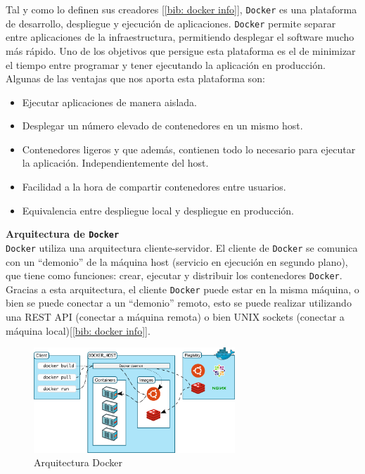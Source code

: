\documentclass[a4paper, oneside, 12pt]{book}
\begin{document}
	\noindent Tal y como lo definen sus creadores [\ref{bib: docker info}], \texttt{Docker} es una plataforma de desarrollo, despliegue y ejecución de aplicaciones. \texttt{Docker} permite separar entre aplicaciones de la infraestructura, permitiendo desplegar el software mucho más rápido. Uno de los objetivos que persigue esta plataforma es el de minimizar el tiempo entre programar y tener ejecutando la aplicación en producción. Algunas de las ventajas que nos aporta esta plataforma son:
	\begin{itemize}
		\item Ejecutar aplicaciones de manera aislada.
		\item Desplegar un número elevado de contenedores en un mismo host.
		\item Contenedores ligeros y que además, contienen todo lo necesario para ejecutar la aplicación. Independientemente del host.
		\item Facilidad a la hora de compartir contenedores entre usuarios.
		\item Equivalencia entre despliegue local y despliegue en producción.
	\end{itemize}

	\vspace{5px}
	\noindent \textbf{\large Arquitectura de \texttt{Docker}}\\
	
	\noindent \texttt{Docker} utiliza una arquitectura cliente-servidor. El cliente de \texttt{Docker} se comunica con un ``demonio'' de la máquina host (servicio en ejecución en segundo plano), que tiene como funciones: crear, ejecutar y distribuir los contenedores \texttt{Docker}. Gracias a esta arquitectura, el cliente \texttt{Docker} puede estar en la misma máquina, o bien se puede conectar a un ``demonio'' remoto, esto se puede realizar utilizando una REST API (conectar a máquina remota) o bien UNIX sockets (conectar a máquina local)[\ref{bib: docker info}]. 
	
	\begin{figure}[h]
		\begin{center}
			\includegraphics[width=0.675\textwidth]{img/architecture-docker.png}
			\caption{Arquitectura Docker}
			\label{img: docker arch}
		\end{center}
	\end{figure}
	
\end{document}
